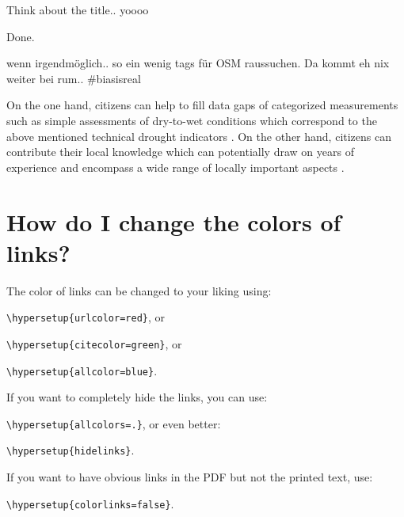 Think about the title.. yoooo

Done.


wenn irgendmöglich.. so ein wenig tags für OSM raussuchen. Da kommt eh nix weiter bei rum.. #biasisreal








On the one hand, citizens can help to fill data gaps of categorized measurements such as simple assessments of dry-to-wet conditions which correspond to the above mentioned technical drought indicators \autocite{lackstromBackyardHydroclimatologyCitizen2022}. On the other hand, citizens can contribute their local knowledge which can potentially draw on years of experience and encompass a wide range of locally important aspects \autocite{butteFrameworkWaterSecurity2022,koehlerCitizenParticipationCollaborative2008,njambi-szlapkaIntegratingCommunityVoices}.








\section{How do I change the colors of links?}

The color of links can be changed to your liking using:

{\small\verb!\hypersetup{urlcolor=red}!}, or

{\small\verb!\hypersetup{citecolor=green}!}, or

{\small\verb!\hypersetup{allcolor=blue}!}.

\noindent If you want to completely hide the links, you can use:

{\small\verb!\hypersetup{allcolors=.}!}, or even better: 

{\small\verb!\hypersetup{hidelinks}!}.

\noindent If you want to have obvious links in the PDF but not the printed text, use:

{\small\verb!\hypersetup{colorlinks=false}!}.





